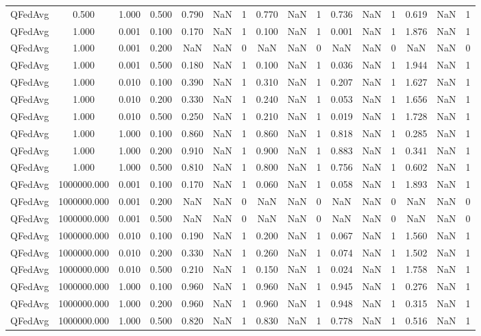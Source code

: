 \begin{table}[htbp]
\begin{tabular}{lccccccccccccccc}
QFedAvg & 0.500 & 1.000 & 0.500 & 0.790 & NaN & 1 & 0.770 & NaN & 1 & 0.736 & NaN & 1 & 0.619 & NaN & 1 \\
QFedAvg & 1.000 & 0.001 & 0.100 & 0.170 & NaN & 1 & 0.100 & NaN & 1 & 0.001 & NaN & 1 & 1.876 & NaN & 1 \\
QFedAvg & 1.000 & 0.001 & 0.200 & NaN & NaN & 0 & NaN & NaN & 0 & NaN & NaN & 0 & NaN & NaN & 0 \\
QFedAvg & 1.000 & 0.001 & 0.500 & 0.180 & NaN & 1 & 0.100 & NaN & 1 & 0.036 & NaN & 1 & 1.944 & NaN & 1 \\
QFedAvg & 1.000 & 0.010 & 0.100 & 0.390 & NaN & 1 & 0.310 & NaN & 1 & 0.207 & NaN & 1 & 1.627 & NaN & 1 \\
QFedAvg & 1.000 & 0.010 & 0.200 & 0.330 & NaN & 1 & 0.240 & NaN & 1 & 0.053 & NaN & 1 & 1.656 & NaN & 1 \\
QFedAvg & 1.000 & 0.010 & 0.500 & 0.250 & NaN & 1 & 0.210 & NaN & 1 & 0.019 & NaN & 1 & 1.728 & NaN & 1 \\
QFedAvg & 1.000 & 1.000 & 0.100 & 0.860 & NaN & 1 & 0.860 & NaN & 1 & 0.818 & NaN & 1 & 0.285 & NaN & 1 \\
QFedAvg & 1.000 & 1.000 & 0.200 & 0.910 & NaN & 1 & 0.900 & NaN & 1 & 0.883 & NaN & 1 & 0.341 & NaN & 1 \\
QFedAvg & 1.000 & 1.000 & 0.500 & 0.810 & NaN & 1 & 0.800 & NaN & 1 & 0.756 & NaN & 1 & 0.602 & NaN & 1 \\
QFedAvg & 1000000.000 & 0.001 & 0.100 & 0.170 & NaN & 1 & 0.060 & NaN & 1 & 0.058 & NaN & 1 & 1.893 & NaN & 1 \\
QFedAvg & 1000000.000 & 0.001 & 0.200 & NaN & NaN & 0 & NaN & NaN & 0 & NaN & NaN & 0 & NaN & NaN & 0 \\
QFedAvg & 1000000.000 & 0.001 & 0.500 & NaN & NaN & 0 & NaN & NaN & 0 & NaN & NaN & 0 & NaN & NaN & 0 \\
QFedAvg & 1000000.000 & 0.010 & 0.100 & 0.190 & NaN & 1 & 0.200 & NaN & 1 & 0.067 & NaN & 1 & 1.560 & NaN & 1 \\
QFedAvg & 1000000.000 & 0.010 & 0.200 & 0.330 & NaN & 1 & 0.260 & NaN & 1 & 0.074 & NaN & 1 & 1.502 & NaN & 1 \\
QFedAvg & 1000000.000 & 0.010 & 0.500 & 0.210 & NaN & 1 & 0.150 & NaN & 1 & 0.024 & NaN & 1 & 1.758 & NaN & 1 \\
QFedAvg & 1000000.000 & 1.000 & 0.100 & 0.960 & NaN & 1 & 0.960 & NaN & 1 & 0.945 & NaN & 1 & 0.276 & NaN & 1 \\
QFedAvg & 1000000.000 & 1.000 & 0.200 & 0.960 & NaN & 1 & 0.960 & NaN & 1 & 0.948 & NaN & 1 & 0.315 & NaN & 1 \\
QFedAvg & 1000000.000 & 1.000 & 0.500 & 0.820 & NaN & 1 & 0.830 & NaN & 1 & 0.778 & NaN & 1 & 0.516 & NaN & 1 \\
\bottomrule
\end{tabular}
\end{table}
